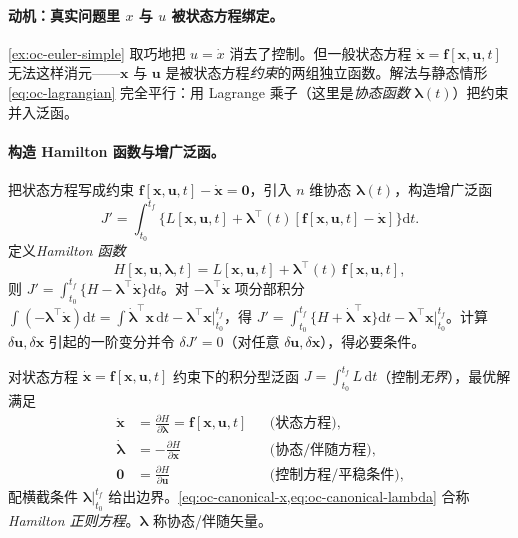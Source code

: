 \paragraph{动机：真实问题里 $x$ 与 $u$ 被状态方程绑定。}
\cref{ex:oc-euler-simple} 取巧地把 $u=\dot x$ 消去了控制。但一般状态方程 $\dot{\mathbf x}=\mathbf f[\mathbf x,\mathbf u,t]$ 无法这样消元——$\mathbf x$ 与 $\mathbf u$ 是被状态方程\emph{约束}的两组独立函数。解法与静态情形 \cref{eq:oc-lagrangian} 完全平行：用 Lagrange 乘子（这里是\emph{协态函数} $\boldsymbol\lambda(t)$）把约束并入泛函\cite{liubao2006modern,zhang2017modern}。

\paragraph{构造 Hamilton 函数与增广泛函。}
把状态方程写成约束 $\mathbf f[\mathbf x,\mathbf u,t]-\dot{\mathbf x}=\mathbf0$，引入 $n$ 维协态 $\boldsymbol\lambda(t)$，构造增广泛函
\begin{equation}
  J'=\int_{t_0}^{t_f}\big\{L[\mathbf x,\mathbf u,t]+\boldsymbol\lambda^\top(t)[\mathbf f[\mathbf x,\mathbf u,t]-\dot{\mathbf x}]\big\}\mathrm dt.
  \label{eq:oc-augmented}
\end{equation}
定义\emph{Hamilton 函数}
\begin{equation}
  \boxed{H[\mathbf x,\mathbf u,\boldsymbol\lambda,t]=L[\mathbf x,\mathbf u,t]+\boldsymbol\lambda^\top(t)\,\mathbf f[\mathbf x,\mathbf u,t],}
  \label{eq:oc-hamiltonian}
\end{equation}
则 $J'=\int_{t_0}^{t_f}\{H-\boldsymbol\lambda^\top\dot{\mathbf x}\}\mathrm dt$。对 $-\boldsymbol\lambda^\top\dot{\mathbf x}$ 项分部积分 $\int(-\boldsymbol\lambda^\top\dot{\mathbf x})\mathrm dt=\int\dot{\boldsymbol\lambda}^\top\mathbf x\,\mathrm dt-\boldsymbol\lambda^\top\mathbf x|_{t_0}^{t_f}$，得 $J'=\int_{t_0}^{t_f}\{H+\dot{\boldsymbol\lambda}^\top\mathbf x\}\mathrm dt-\boldsymbol\lambda^\top\mathbf x|_{t_0}^{t_f}$。计算 $\delta\mathbf u,\delta\mathbf x$ 引起的一阶变分并令 $\delta J'=0$（对任意 $\delta\mathbf u,\delta\mathbf x$），得必要条件。

\begin{theorem}\label{thm:oc-canonical}
对状态方程 $\dot{\mathbf x}=\mathbf f[\mathbf x,\mathbf u,t]$ 约束下的积分型泛函 $J=\int_{t_0}^{t_f}L\,\mathrm dt$（控制\emph{无界}），最优解满足
\begin{align}
  \dot{\mathbf x}&=\frac{\partial H}{\partial\boldsymbol\lambda}=\mathbf f[\mathbf x,\mathbf u,t] &&\text{(状态方程)},\label{eq:oc-canonical-x}\\
  \dot{\boldsymbol\lambda}&=-\frac{\partial H}{\partial\mathbf x} &&\text{(协态/伴随方程)},\label{eq:oc-canonical-lambda}\\
  \mathbf0&=\frac{\partial H}{\partial\mathbf u} &&\text{(控制方程/平稳条件)},\label{eq:oc-canonical-u}
\end{align}
配横截条件 $\boldsymbol\lambda|_{t_0}^{t_f}$ 给出边界。\cref{eq:oc-canonical-x,eq:oc-canonical-lambda} 合称\emph{Hamilton 正则方程}。$\boldsymbol\lambda$ 称协态/伴随矢量。
\end{theorem}

